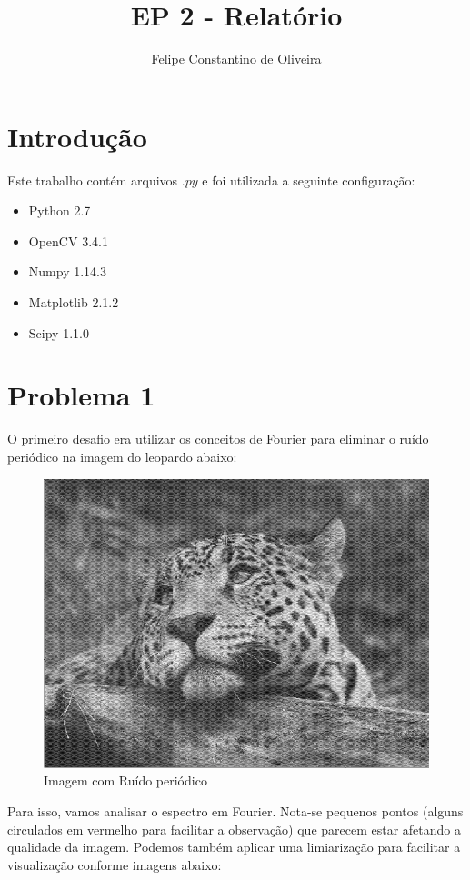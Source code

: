 \documentclass{article}
\title {\vspace{-3cm}EP 2 - Relatório}
\author{Felipe Constantino de Oliveira}
\affil{%
	MAC0417/5768 - Visão e Processamento de Imagens - IME-USP
}
\date{}
\begin{document}
	
	\maketitle

	\section{Introdução}
	
	Este trabalho contém arquivos $.py$ e foi utilizada a seguinte configuração:
	\begin{itemize}
		\item Python 2.7
		\item OpenCV 3.4.1
		\item Numpy 1.14.3
		\item Matplotlib 2.1.2
		\item Scipy 1.1.0
	\end{itemize}
	
	\section{Problema 1}

	O primeiro desafio era utilizar os conceitos de Fourier para eliminar o ruído periódico na imagem do leopardo abaixo:
	
	\begin{figure}[H]
		\centering
		\includegraphics[scale=0.3]{images/1_original.png}
		\caption{Imagem com Ruído periódico} 
	\end{figure}

	Para isso, vamos analisar o espectro em Fourier. Nota-se pequenos pontos (alguns circulados em vermelho para facilitar a observação) que parecem estar afetando a qualidade da imagem. Podemos também aplicar uma limiarização para facilitar a visualização conforme imagens abaixo:
		
\end{document}

